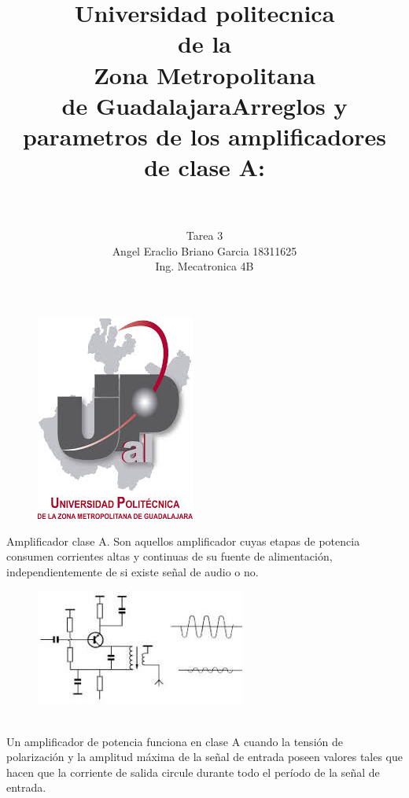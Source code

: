 \documentclass[12pt,a4paper]{article}
\begin{document}
\title{Universidad politecnica\\ de la \\ Zona Metropolitana\\ de Guadalajara}
\author{Tarea 3\\ Angel Eraclio Briano Garcia 18311625\\ Ing. Mecatronica 4B}
\maketitle
\begin{figure}[h!]
\centering
\includegraphics[scale=1]{untitled.png} 
\end{figure}
\newpage
\title{\textbf{Arreglos y parametros de los amplificadores de clase A:}\\ \\ }
Amplificador clase A. Son aquellos amplificador cuyas etapas de potencia consumen corrientes altas y continuas de su fuente de alimentación, independientemente de si existe señal de audio o no.\\
\begin{figure}[h!]
\centering
\includegraphics[scale=1]{260px-AmplificadorclaseA.jpg} 
\end{figure}\\
Un amplificador de potencia funciona en clase A cuando la tensión de polarización y la amplitud máxima de la señal de entrada poseen valores tales que hacen que la corriente de salida circule durante todo el período de la señal de entrada.\\
\end{document}
